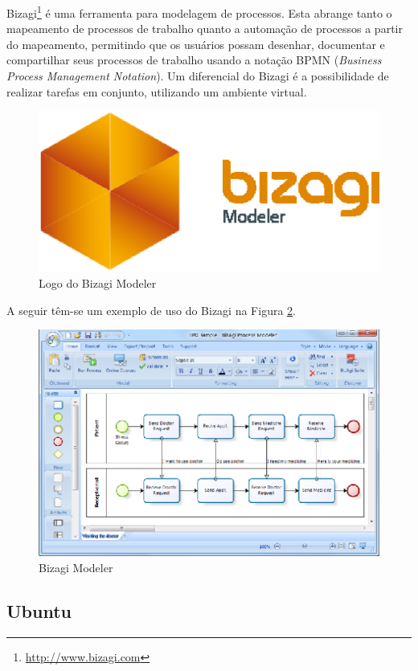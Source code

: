 Bizagi\footnote{\url{http://www.bizagi.com}} é uma ferramenta para modelagem de processos. Esta abrange tanto o mapeamento de processos de trabalho quanto a automação de processos a partir do mapeamento, permitindo que os usuários possam desenhar, documentar e compartilhar seus processos de trabalho usando a notação BPMN (\textit{Business Process Management Notation}). Um diferencial do Bizagi é a possibilidade de realizar tarefas em conjunto, utilizando um ambiente virtual.

\begin{figure}[!h]
	\centering
	\includegraphics[scale=0.4]{figuras/capitulo3/logo_bizagi.eps}
	\caption{Logo do Bizagi Modeler}
	\label{logo_bizagi}
\end{figure}

A seguir têm-se um exemplo de uso do Bizagi na Figura \ref{bizagi}.

\begin{figure}[!h]
	\centering
	\includegraphics[scale=1.5]{figuras/capitulo3/bizagi.eps}
	\caption{Bizagi Modeler}
	\label{bizagi}
\end{figure}

\subsection{Ubuntu}

